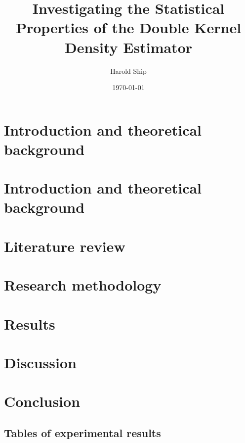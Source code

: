 \documentclass[a4paper,12pt,titlepage,twoside,openany]{book}
\title{Investigating the Statistical Properties of the Double Kernel Density Estimator}
\author{Harold Ship}
\date{\today}
\begin{document}
\frontmatter                            %
\maketitle                              %
\tableofcontents                        %

\clearpage
\listoftables
\clearpage
\listoffigures
\clearpage
\printnomenclature
\clearpage

\mainmatter                             %

\chapter{Introduction and theoretical background}


\chapter{Introduction and theoretical background}


\chapter{Literature review}

\chapter{Research methodology}


\chapter{Results}


\chapter{Discussion}

\chapter{Conclusion}

 

\begin{appendices}
\chapter{Tables of experimental results}
\label{chp:results_tables}

\end{appendices}
\end{document}
